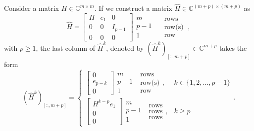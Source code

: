 \begin{lemma}
    \label{lem:hhatpowered}
    Consider a matrix $H \in \mathbb{C}^{m \times m}$.
    If we construct a matrix $\hat{H} \in \mathbb{C}^{(m+p) \times (m+p)}$ as
    \begin{equation}
        \label{eq:hhatdefinition}
        \hat{H} =
        \begin{bmatrix}
            H & e_1 & 0       \\
            0   & 0   & I_{p-1} \\
            0   & 0   & 0
        \end{bmatrix}
        \begin{matrix} m \\ p-1 \\ 1 \end{matrix}
        \begin{matrix} \quad \text{rows} \\ \quad \text{row(s)} \\ \quad \text{row} \end{matrix}
        \: ,
    \end{equation}
    with $p \ge 1$, the last column of $\hat{H}^k$, denoted by $(\hat{H}^k)_{[:, m+p]} \in \mathbb{C}^{m+p}$ takes the form
    \begin{equation*}
        \label{eq:hhatpowered}
        (\hat{H}^k)_{[:, m+p]} =
        \begin{cases}
            \begin{bmatrix} 0 \\ e_{p-k} \\ 0 \end{bmatrix}
            \begin{matrix} m \\ p-1 \\ 1 \end{matrix}
            \; \begin{matrix} \text{rows} \\ \text{row(s)} \\ \text{row} \end{matrix},
            & k \in \{ 1, 2, \dots, p-1 \}
            \\
            \begin{bmatrix} H^{k-p} e_1 \\ 0 \\ 0 \end{bmatrix}
            \begin{matrix} m \\ p-1 \\ 1 \end{matrix}
            \; \begin{matrix} \text{rows} \\ \text{rows} \\ \text{rows} \end{matrix},
            & k \ge p
        \end{cases}.
    \end{equation*}
\end{lemma}
